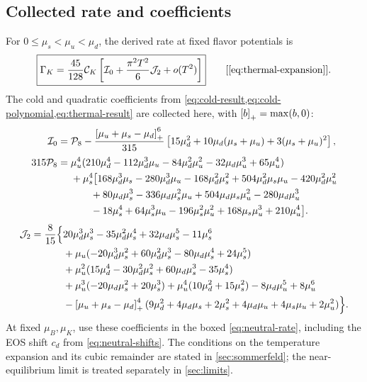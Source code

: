 \clearpage
\subsection*{Collected rate and coefficients}
For \(0\leq\mu_s<\mu_u<\mu_d\), the derived rate at fixed flavor potentials is
\begin{equation*}
 \boxed{\displaystyle
 \Gamma_K=\frac{45}{128}\CK
 \left[\Izero+\frac{\pi^2T^2}{6}\Jtwo+o(T^2)\right]}
 \qquad\text{[\cref{eq:thermal-expansion}]}.
\end{equation*}
The cold and quadratic coefficients from \cref{eq:cold-result,eq:cold-polynomial,eq:thermal-result} are collected here, with \(\left[b\right]_+=\max(b,0)\):
\begin{align*}
 \mathcal I_0={}&\mathcal P_8
 -\frac{\left[\mu_u+\mu_s-\mu_d\right]_+^{6}}{315}
 \left[15\mu_d^2+10\mu_d(\mu_s+\mu_u)+3(\mu_s+\mu_u)^2\right],\\[0.5ex]
 315\mathcal P_8={}&
 \mu_u^4(210\mu_d^4-112\mu_d^3\mu_u-84\mu_d^2\mu_u^2
            -32\mu_d\mu_u^3+65\mu_u^4)\\
 &+\mu_s^4\big[168\mu_d^3\mu_s-280\mu_d^3\mu_u
 -168\mu_d^2\mu_s^2+504\mu_d^2\mu_s\mu_u-420\mu_d^2\mu_u^2\\
 &\qquad+80\mu_d\mu_s^3-336\mu_d\mu_s^2\mu_u
 +504\mu_d\mu_s\mu_u^2-280\mu_d\mu_u^3\\
 &\qquad-18\mu_s^4+64\mu_s^3\mu_u-196\mu_s^2\mu_u^2
 +168\mu_s\mu_u^3+210\mu_u^4\big].
\end{align*}
\begin{align*}
 \mathcal J_2=\frac{8}{15}\Big\{&
 20\mu_d^3\mu_s^3-35\mu_d^2\mu_s^4+32\mu_d\mu_s^5-11\mu_s^6\\
 &+\mu_u(-20\mu_d^3\mu_s^2+60\mu_d^2\mu_s^3
                  -80\mu_d\mu_s^4+24\mu_s^5)\\
 &+\mu_u^2(15\mu_d^4-30\mu_d^2\mu_s^2
                  +60\mu_d\mu_s^3-35\mu_s^4)\\
 &+\mu_u^3(-20\mu_d\mu_s^2+20\mu_s^3)
   +\mu_u^4(10\mu_d^2+15\mu_s^2)-8\mu_d\mu_u^5+8\mu_u^6\\
 &-\left[\mu_u+\mu_s-\mu_d\right]_+^{4}
 (9\mu_d^2+4\mu_d\mu_s+2\mu_s^2
       +4\mu_d\mu_u+4\mu_s\mu_u+2\mu_u^2)\Big\}.
\end{align*}
At fixed \(\mu_B,\mu_K\), use these coefficients in the boxed \cref{eq:neutral-rate}, including the EOS shift \(c_d\) from \cref{eq:neutral-shifts}.
The conditions on the temperature expansion and its cubic remainder are stated in \cref{sec:sommerfeld}; the near-equilibrium limit is treated separately in \cref{sec:limits}.
\clearpage
